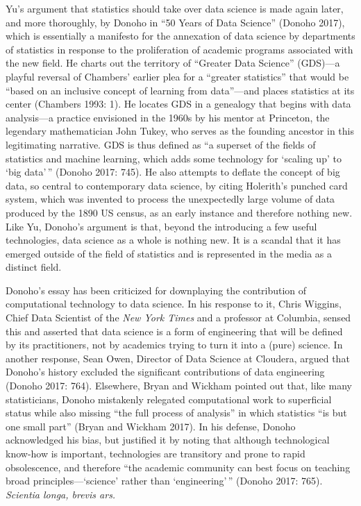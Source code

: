 \documentclass[
  letterpaper,
]{report}
\begin{document}
Yu's argument that statistics should take over data science is made
again later, and more thoroughly, by Donoho in ``50 Years of Data
Science'' (Donoho 2017), which is essentially a manifesto for the
annexation of data science by departments of statistics in response to
the proliferation of academic programs associated with the new field. He
charts out the territory of ``Greater Data Science'' (GDS)---a playful
reversal of Chambers' earlier plea for a ``greater statistics'' that
would be ``based on an inclusive concept of learning from data''---and
places statistics at its center (Chambers 1993: 1). He locates GDS in a
genealogy that begins with data analysis---a practice envisioned in the
1960s by his mentor at Princeton, the legendary mathematician John
Tukey, who serves as the founding ancestor in this legitimating
narrative. GDS is thus defined as ``a superset of the fields of
statistics and machine learning, which adds some technology for `scaling
up' to `big data'\,'' (Donoho 2017: 745). He also attempts to deflate
the concept of big data, so central to contemporary data science, by
citing Holerith's punched card system, which was invented to process the
unexpectedly large volume of data produced by the 1890 US census, as an
early instance and therefore nothing new. Like Yu, Donoho's argument is
that, beyond the introducing a few useful technologies, data science as
a whole is nothing new. It is a scandal that it has emerged outside of
the field of statistics and is represented in the media as a distinct
field.

Donoho's essay has been criticized for downplaying the contribution of
computational technology to data science. In his response to it, Chris
Wiggins, Chief Data Scientist of the \emph{New York Times} and a
professor at Columbia, sensed this and asserted that data science is a
form of engineering that will be defined by its practitioners, not by
academics trying to turn it into a (pure) science. In another response,
Sean Owen, Director of Data Science at Cloudera, argued that Donoho's
history excluded the significant contributions of data engineering
(Donoho 2017: 764). Elsewhere, Bryan and Wickham pointed out that, like
many statisticians, Donoho mistakenly relegated computational work to
superficial status while also missing ``the full process of analysis''
in which statistics ``is but one small part'' (Bryan and Wickham 2017).
In his defense, Donoho acknowledged his bias, but justified it by noting
that although technological know-how is important, technologies are
transitory and prone to rapid obsolescence, and therefore ``the academic
community can best focus on teaching broad principles---`science' rather
than `engineering'\,'' (Donoho 2017: 765). \emph{Scientia longa, brevis
ars.}
\end{document}
